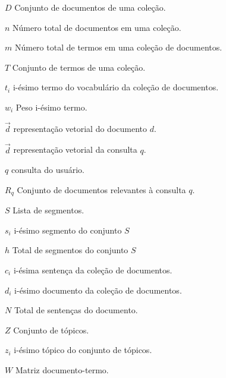 


\begin{simbolos}

	\item[$D $]			Conjunto de documentos de uma coleção. 
	\item[$n $]			Número total de documentos em uma coleção.
	\item[$m $]			Número total de termos em uma coleção de documentos.
	\item[$T $]			Conjunto de termos de uma coleção. 
	\item[$t_i $]		i-ésimo termo do vocabulário da coleção de documentos. 
	\item[$w_i $]		Peso i-ésimo termo.
	\item[$ \vec{d} $]	representação vetorial do documento $d$.
	\item[$ \vec{d} $]	representação vetorial da consulta $q$.
	\item[$ q $]		consulta do usuário.
	\item[$R_q$]        Conjunto de documentos relevantes à consulta $q$.
	\item[$ S $]		Lista de segmentos. 
	\item[$s_i $]		i-ésimo segmento do conjunto $S$
	\item[$ h $]		Total de segmentos do conjunto $S$
	\item[$ c_i $]		i-ésima sentença da coleção de documentos. 
	\item[$ d_i $]		i-ésimo documento da coleção de documentos. 
	\item[$ N $]		Total de sentenças do documento.
	\item[$ Z $]		Conjunto de tópicos. 
	\item[$ z_i $]		i-ésimo tópico do conjunto de tópicos. 
	\item[$ W $]		Matriz documento-termo.


 
 
 
 
 
 
 
 
 
 
 
 
 
 
 
 
 
 
 
 
  \end{simbolos}





